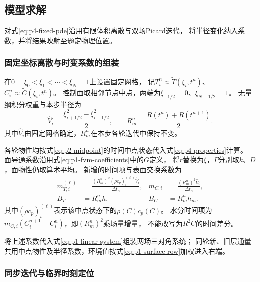 \subsection{模型求解}
\label{sec:p4-solution}

对式\eqref{eq:p4-fixed-pde}沿用有限体积离散与双场Picard迭代，
将半径变化纳入系数，并将结果映射至题定物理位置。

\subsubsection{固定坐标离散与时变系数的组装}

在$0=\xi_0<\xi_1<\cdots<\xi_N=1$上设置固定网格，
记$T_i^n\approx\widetilde T(\xi_i,t^n)$、
$C_i^n\approx\widetilde C(\xi_i,t^n)$。
控制面取相邻节点中点，两端为$\xi_{-1/2}=0$、$\xi_{N+1/2}=1$。
无量纲积分权重与本步半径为
\begin{equation}
  \widehat V_i=\frac{\xi_{i+1/2}^2-\xi_{i-1/2}^2}{2},
  \qquad
  R_m^n=\frac{R(t^n)+R(t^{n+1})}{2}.
  \label{eq:p4-discrete-geometry}
\end{equation}
其中$\widehat V_i$由固定网格确定，$R_m^n$在本步各轮迭代中保持不变。

各轮物性均按式\eqref{eq:p2-midpoint}的时间中点状态代入式\eqref{eq:p4-properties}计算。
面导通系数沿用式\eqref{eq:p1-fvm-coefficients}中的$G$定义，
将$r$替换为$\xi$，$\Gamma$分别取$k$、$D$，面物性仍取算术平均。
新增的时间项与表面交换系数为
\begin{equation}
\begin{aligned}
  m_{T,i}^{(\ell)}
    &=\frac{(R_m^n)^2(\rho c_p)_i^{(\ell)}\widehat V_i}{\Delta t_n},
  &m_{C,i}
    &=\frac{(R_m^n)^2\widehat V_i}{\Delta t_n},\\
  B_T&=R_m^n h,
  &B_C&=R_m^n h_m.
\end{aligned}
\label{eq:p4-discrete-coefficients}
\end{equation}
其中$(\rho c_p)_i^{(\ell)}$表示该中点状态下的$\rho(C)c_p(C)$。
水分时间项为$m_{C,i}(C_i^{n+1}-C_i^n)$，即$(R_m^n)^2$乘场量增量，
不能改写为$R^2C$的时间差分。

将上述系数代入式\eqref{eq:p1-linear-system}组装两场三对角系统；
同轮新、旧层通量共用中点物性及半径系数，环境值按式\eqref{eq:p1-surface-row}加权进入右端。

\subsubsection{同步迭代与临界时刻定位}

